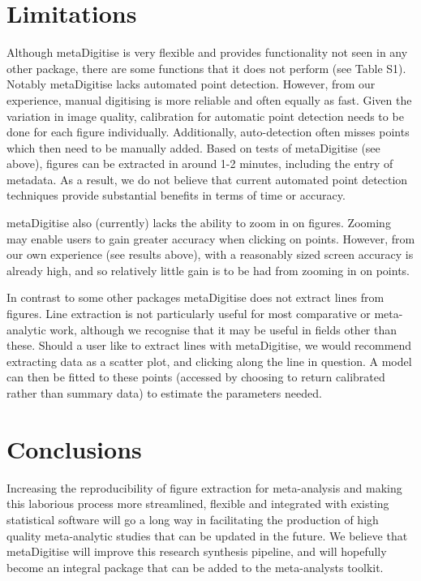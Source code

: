 \documentclass[12pt]{article}
\newcommand{\pkg}[1]{{\fontseries{b}\selectfont #1}}
\begin{document}




\section{Limitations}

Although \pkg{metaDigitise} is very flexible and provides functionality not seen in any other package, there are some functions that it does not perform (see Table S1). Notably \pkg{metaDigitise} lacks automated point detection. However, from our experience, manual digitising is more reliable and often equally as fast. Given the variation in image quality, calibration for automatic point detection needs to be done for each figure individually. Additionally, auto-detection often misses points which then need to be manually added. Based on tests of \pkg{metaDigitise} (see above), figures can be extracted in around 1-2 minutes, including the entry of metadata. As a result, we do not believe that current automated point detection techniques provide substantial benefits in terms of time or accuracy.

\pkg{metaDigitise} also (currently) lacks the ability to zoom in on figures. Zooming may enable users to gain greater accuracy when clicking on points. However, from our own experience (see results above), with a reasonably sized screen accuracy is already high, and so relatively little gain is to be had from zooming in on points.

In contrast to some other packages \pkg{metaDigitise} does not extract lines from figures. Line extraction is not particularly useful for most comparative or meta-analytic work, although we recognise that it may be useful in fields other than these. Should a user like to extract lines with \pkg{metaDigitise}, we would recommend extracting data as a scatter plot, and clicking along the line in question. A model can then be fitted to these points (accessed by choosing to return calibrated rather than summary data) to estimate the parameters needed.





\section{Conclusions}
Increasing the reproducibility of figure extraction for meta-analysis and making this laborious process more streamlined, flexible and integrated with existing statistical software will go a long way in facilitating the production of high quality meta-analytic studies that can be updated in the future. We believe that \pkg{metaDigitise} will improve this research synthesis pipeline, and will hopefully become an integral package that can be added to the meta-analysts toolkit.
\end{document}
